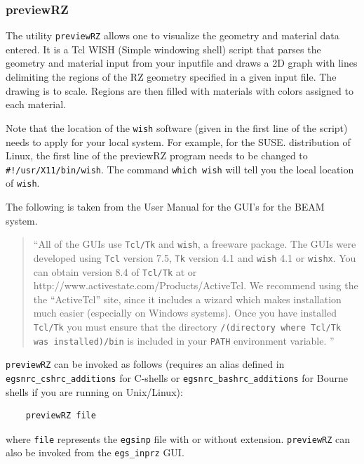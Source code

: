 \documentclass[12pt,twoside]{article}  %
\begin{document}
\subsubsection{previewRZ}

 

The utility \verb+previewRZ+ allows one to visualize the geometry and material
data entered. It is a Tcl WISH (Simple windowing shell)
script that parses the geometry and material input from your inputfile and
draws a 2D graph with lines delimiting the regions of the RZ geometry
specified in a given input file.
The drawing is to scale. Regions are then filled with materials with
colors assigned to each material. 

Note that the location of the \verb+wish+ software (given in the first line
of the script) needs to apply
for your local system. For example, for the SUSE. distribution of
Linux, the first line of the previewRZ program needs to be changed to
\verb+#!/usr/X11/bin/wish+. The command {\tt which wish} will tell you
the local location of {\tt wish}.

The following is taken from the User Manual for the GUI's for the BEAM
system\cite{Tr04}.
\begin{quote}
``All of the GUIs use {\tt Tcl/Tk} and {\tt wish}, a freeware package.
The GUIs were developed using {\tt Tcl} version 7.5, {\tt Tk} version
4.1 and {\tt wish} 4.1 or {\tt wishx}.  You
can obtain version 8.4 of {\tt Tcl/Tk} at
 or \\
{http://www.activestate.com/Products/ActiveTcl}.  We recommend using
the the ``ActiveTcl'' site, since it includes a wizard
which makes installation much easier (especially on Windows systems).
Once you have installed {\tt Tcl/Tk} you must ensure that the directory
{\tt /(directory where Tcl/Tk was installed)/bin} is included in your
{\tt PATH} environment variable. ''
\end{quote}
\verb+previewRZ+ can be invoked as follows (requires an alias defined in
\verb+egsnrc_cshrc_additions+ for C-shells or 
\verb+egsnrc_bashrc_additions+ for Bourne shells if you are running
on Unix/Linux):
\begin{verbatim}
    previewRZ file
\end{verbatim}
where \verb+file+ represents the \verb+egsinp+ file with or without
extension.  \verb+previewRZ+ can also be invoked from the
{\tt egs\_inprz} GUI\cite{Ma03}.
\end{document}
